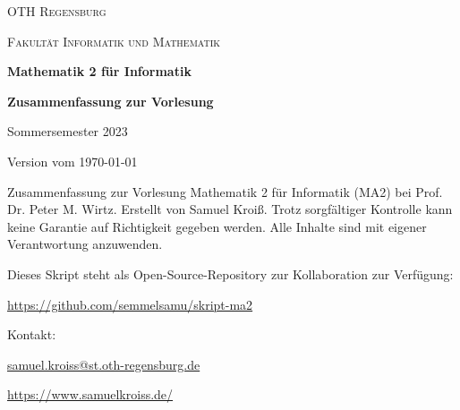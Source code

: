 \begin{titlepage}
    \centering
    {\textsc{OTH Regensburg} \par}
    {\textsc{Fakultät Informatik und Mathematik} \par}
    \vspace{8cm}
    {\huge\bfseries 
        Mathematik 2 für Informatik
    \par}
    \vspace{12pt}
    {\Large\bfseries 
        Zusammenfassung zur Vorlesung
    \par}
    \vspace{8cm}
    {\large Sommersemester 2023 \par Version vom \today\par}
    \vfill
    Zusammenfassung zur Vorlesung Mathematik 2 für Informatik (MA2) bei Prof. Dr. Peter M. Wirtz. Erstellt von Samuel Kroiß. Trotz sorgfältiger Kontrolle kann keine Garantie auf Richtigkeit gegeben werden. Alle Inhalte sind mit eigener Verantwortung anzuwenden.
\end{titlepage}

\thispagestyle{plain}
\footnotesize

Dieses Skript steht als Open-Source-Repository zur Kollaboration zur Verfügung:\par
\vspace{2pt}
\url{https://github.com/semmelsamu/skript-ma2}\par

\vspace{12pt}

Kontakt:\par
\vspace{1pt}
\url{samuel.kroiss@st.oth-regensburg.de}\par
\url{https://www.samuelkroiss.de/}